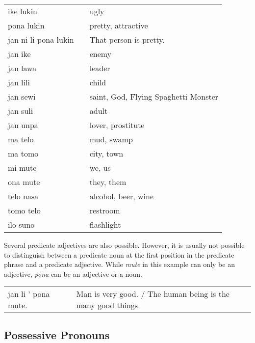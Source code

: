 \begin{supertabular}{p{5,5cm}|ll}
ike lukin && ugly  \\
pona lukin && pretty, attractive \\
jan ni li pona lukin && That person is pretty. \\
jan ike && enemy \\
jan lawa && leader \\
jan lili && child \\
jan sewi && saint, God, Flying Spaghetti Monster \\
jan suli && adult \\
jan unpa && lover, prostitute \\
ma telo && mud, swamp \\
ma tomo && city, town \\
mi mute && we, us \\
ona mute && they, them \\
telo nasa && alcohol, beer, wine \\
tomo telo && restroom \\
ilo suno && flashlight \\ 
\end{supertabular} 

Several predicate adjectives are also possible. 
However, it is usually not possible to distinguish between a predicate noun at the first position in the predicate phrase and a predicate adjective. 
While \textit{mute} in this example can only be an adjective, \textit{pona} can be an adjective or a noun. 

\begin{supertabular}{p{5,5cm}|ll}
jan li ' pona mute. &&  Man is very good. / The human being is the many good things. \\
\end{supertabular} 

\subsection*{Possessive Pronouns}

